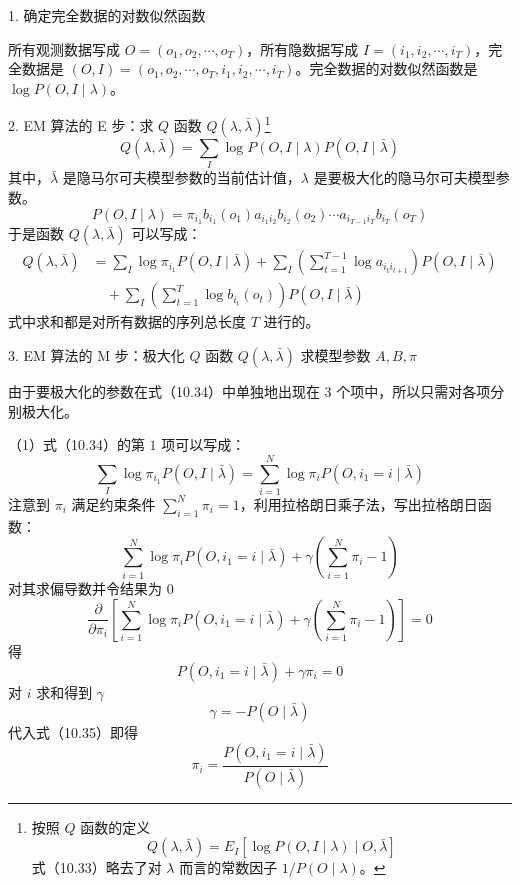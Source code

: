 \documentclass[UTF8, 12pt, fontset=fandol, oneside]{ctexart}
\begin{document}
1. 确定完全数据的对数似然函数

所有观测数据写成 $O=(o_1,o_2,\cdots,o_T)$，所有隐数据写成 $I=(i_1,i_2,\cdots,i_T)$，完全数据是 $(O,I)=(o_1,o_2,\cdots,o_T,i_1,i_2,\cdots,i_T)$。完全数据的对数似然函数是 $\log P(O,I\mid\lambda)$。

2. EM 算法的 E 步：求 $Q$ 函数 $Q(\lambda,\bar\lambda)$\footnote{按照 $Q$ 函数的定义
\[
  Q(\lambda,\bar\lambda)=E_I[\log P(O,I\mid\lambda)\mid O,\bar\lambda]
\]
式（10.33）略去了对 $\lambda$ 而言的常数因子 $1/P(O\mid\lambda)$。}
\begin{equation}
  Q(\lambda,\bar\lambda)=\sum_I \log P(O,I\mid\lambda)P(O,I\mid\bar\lambda)
  \tag{10.33}
\end{equation}
其中，$\bar\lambda$ 是隐马尔可夫模型参数的当前估计值，$\lambda$ 是要极大化的隐马尔可夫模型参数。
\[
  P(O,I\mid\lambda)=\pi_{i_1}b_{i_1}(o_1)a_{i_1i_2}b_{i_2}(o_2)\cdots a_{i_{T-1}i_T}b_{i_T}(o_T)
\]
于是函数 $Q(\lambda,\bar\lambda)$ 可以写成：
\begin{equation}
\begin{aligned}
  Q(\lambda,\bar\lambda)
  &=
  \sum_I \log\pi_{i_1}P(O,I\mid\bar\lambda)
  +\sum_I\left(\sum_{t=1}^{T-1}\log a_{i_t i_{t+1}}\right)P(O,I\mid\bar\lambda)\\
  &\quad
  +\sum_I\left(\sum_{t=1}^{T}\log b_{i_t}(o_t)\right)P(O,I\mid\bar\lambda)
\end{aligned}
  \tag{10.34}
\end{equation}
式中求和都是对所有数据的序列总长度 $T$ 进行的。

3. EM 算法的 M 步：极大化 $Q$ 函数 $Q(\lambda,\bar\lambda)$ 求模型参数 $A,B,\pi$

由于要极大化的参数在式（10.34）中单独地出现在 $3$ 个项中，所以只需对各项分别极大化。

（1）式（10.34）的第 $1$ 项可以写成：
\[
  \sum_I \log\pi_{i_1}P(O,I\mid\bar\lambda)=\sum_{i=1}^N\log\pi_i P(O,i_1=i\mid\bar\lambda)
\]
注意到 $\pi_i$ 满足约束条件 $\sum_{i=1}^N\pi_i=1$，利用拉格朗日乘子法，写出拉格朗日函数：
\[
  \sum_{i=1}^N\log\pi_i P(O,i_1=i\mid\bar\lambda)
  +\gamma\left(\sum_{i=1}^N\pi_i-1\right)
\]
对其求偏导数并令结果为 $0$
\begin{equation}
  \frac{\partial}{\partial\pi_i}
  \left[
  \sum_{i=1}^N\log\pi_i P(O,i_1=i\mid\bar\lambda)
  +\gamma\left(\sum_{i=1}^N\pi_i-1\right)
  \right]=0
  \tag{10.35}
\end{equation}
得
\[
  P(O,i_1=i\mid\bar\lambda)+\gamma\pi_i=0
\]
对 $i$ 求和得到 $\gamma$
\[
  \gamma=-P(O\mid\bar\lambda)
\]
代入式（10.35）即得
\begin{equation}
  \pi_i=\frac{P(O,i_1=i\mid\bar\lambda)}{P(O\mid\bar\lambda)}
  \tag{10.36}
\end{equation}
\end{document}
